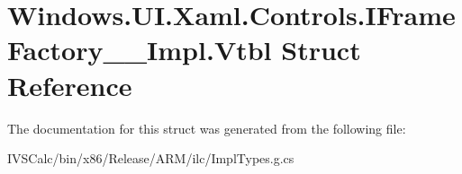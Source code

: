 \hypertarget{struct_windows_1_1_u_i_1_1_xaml_1_1_controls_1_1_i_frame_factory_____impl_1_1_vtbl}{}\section{Windows.\+U\+I.\+Xaml.\+Controls.\+I\+Frame\+Factory\+\_\+\+\_\+\+Impl.\+Vtbl Struct Reference}
\label{struct_windows_1_1_u_i_1_1_xaml_1_1_controls_1_1_i_frame_factory_____impl_1_1_vtbl}


The documentation for this struct was generated from the following file\+:\begin{DoxyCompactItemize}
\item 
I\+V\+S\+Calc/bin/x86/\+Release/\+A\+R\+M/ilc/Impl\+Types.\+g.\+cs\end{DoxyCompactItemize}
